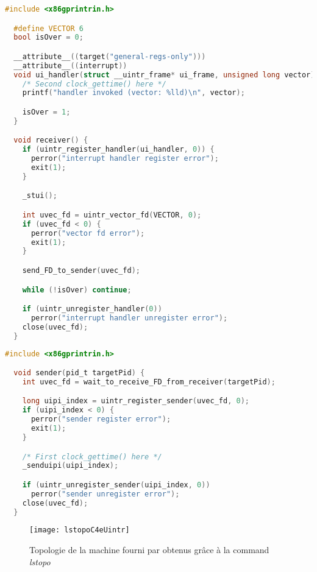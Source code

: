 \begin{lstlisting}[language=c, caption=Code récepteur, label={lst:receiverCode}]
  #include <x86gprintrin.h>

  #define VECTOR 6
  bool isOver = 0;

  __attribute__((target("general-regs-only")))
  __attribute__((interrupt))
  void ui_handler(struct __uintr_frame* ui_frame, unsigned long vector) {
    /* Second clock_gettime() here */
    printf("handler invoked (vector: %lld)\n", vector);

    isOver = 1;
  }

  void receiver() {
    if (uintr_register_handler(ui_handler, 0)) {
      perror("interrupt handler register error");
      exit(1);
    }

    _stui();

    int uvec_fd = uintr_vector_fd(VECTOR, 0);
    if (uvec_fd < 0) {
      perror("vector fd error");
      exit(1);
    }

    send_FD_to_sender(uvec_fd);

    while (!isOver) continue;

    if (uintr_unregister_handler(0))
      perror("interrupt handler unregister error");
    close(uvec_fd);
  }
\end{lstlisting}

\begin{lstlisting}[language=c, caption=Code émetteur, label={lst:senderCode}]
  #include <x86gprintrin.h>

  void sender(pid_t targetPid) {
    int uvec_fd = wait_to_receive_FD_from_receiver(targetPid);

    long uipi_index = uintr_register_sender(uvec_fd, 0);
    if (uipi_index < 0) {
      perror("sender register error");
      exit(1);
    }

    /* First clock_gettime() here */
    _senduipi(uipi_index);

    if (uintr_unregister_sender(uipi_index, 0))
      perror("sender unregister error");
    close(uvec_fd);
  }
\end{lstlisting}

\begin{figure}[H]
  \texttt{[image: lstopoC4eUintr]}
  \caption{Topologie de la machine fourni par \atos{} obtenus grâce à la command \emph{lstopo}}
  \label{fig:lstopo}
\end{figure}

